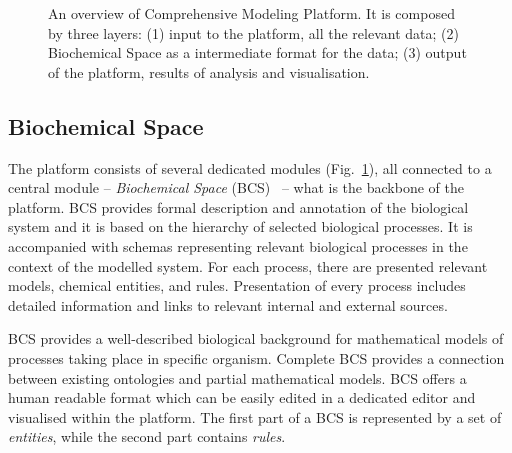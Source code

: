 \documentclass[12pt]{fithesis2}
\begin{document}
\begin{figure}[!h]
\begin{center}
\end{center}
\caption{An overview of Comprehensive Modeling Platform. It is composed by three layers: (1) input to the platform, all the relevant data; (2) Biochemical Space as a intermediate format for the data; (3) output of the platform, results of analysis and visualisation.}\label{cmp_overview}
\end{figure}

\subsection{Biochemical Space}
\label{bcs_general}

The platform consists of several dedicated modules (Fig.~\ref{cmp_overview}), all connected to a central module -- \emph{Biochemical Space} (BCS)~\cite{BCS} -- what is the backbone of the platform. BCS provides formal description and annotation of the biological system and it is based on the hierarchy of selected biological processes. It is accompanied with schemas representing relevant biological processes in the context of the modelled system. For each process, there are presented relevant models, chemical entities, and rules. Presentation of every process includes detailed information and links to relevant internal and external sources.

BCS provides a well-described biological background for mathematical models of processes taking place in specific organism. Complete BCS provides a connection between existing ontologies and partial mathematical models. BCS offers a human readable format which can be easily edited in a dedicated editor and visualised within the platform. The first part of a BCS is represented by a set of \emph{entities}, while the second part contains \emph{rules}.
\end{document}

